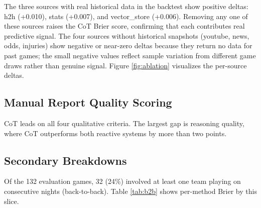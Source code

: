 \documentclass[11pt]{article}
\begin{document}
\begin{multicols}{2}
The three sources with real historical data in the backtest show positive deltas: h2h (+0.010), stats (+0.007), and vector\_store (+0.006). Removing any one of these sources raises the CoT Brier score, confirming that each contributes real predictive signal. The four sources without historical snapshots (youtube, news, odds, injuries) show negative or near-zero deltas because they return no data for past games; the small negative values reflect sample variation from different game draws rather than genuine signal. Figure \ref{fig:ablation} visualizes the per-source deltas.

\subsection{Manual Report Quality Scoring}

\begin{table}[H]
\centering
\caption{Manual report quality scores on a 1--5 scale.}
\label{tab:quality}
\end{table}

CoT leads on all four qualitative criteria. The largest gap is reasoning quality, where CoT outperforms both reactive systems by more than two points.

\subsection{Secondary Breakdowns}

Of the 132 evaluation games, 32 (24\%) involved at least one team playing on consecutive nights (back-to-back). Table \ref{tab:b2b} shows per-method Brier by this slice.

\begin{table}[H]
\centering
\caption{Brier score by back-to-back status.}
\label{tab:b2b}
\end{table}


\end{multicols}
\end{document}
